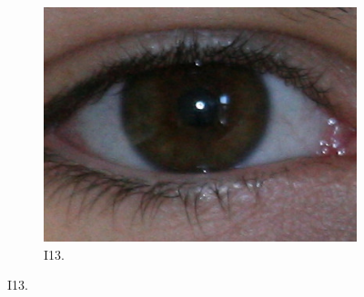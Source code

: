 \begin{figure}[htb]
\begin{subfigure}{0.25\textwidth}
  \includegraphics[width=\linewidth]{img/Resultados/ubirisv2/C3_S1_I13.jpg}
  \caption{I13.}
\end{subfigure}


\end{figure}
